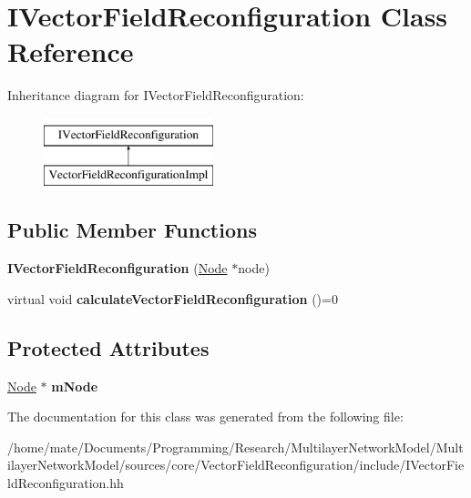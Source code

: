 \hypertarget{classIVectorFieldReconfiguration}{}\section{I\+Vector\+Field\+Reconfiguration Class Reference}
\label{classIVectorFieldReconfiguration}
Inheritance diagram for I\+Vector\+Field\+Reconfiguration\+:\begin{figure}[H]
\begin{center}
\leavevmode
\includegraphics[height=2.000000cm]{classIVectorFieldReconfiguration}
\end{center}
\end{figure}
\subsection*{Public Member Functions}
\begin{DoxyCompactItemize}
\item 
{\bfseries I\+Vector\+Field\+Reconfiguration} (\hyperlink{classNode}{Node} $\ast$node)\hypertarget{classIVectorFieldReconfiguration_a6b663421658c873129a81c3597e0a4c1}{}\label{classIVectorFieldReconfiguration_a6b663421658c873129a81c3597e0a4c1}

\item 
virtual void {\bfseries calculate\+Vector\+Field\+Reconfiguration} ()=0\hypertarget{classIVectorFieldReconfiguration_a3d4ae2c51645c6e6e1955d7ea152ec04}{}\label{classIVectorFieldReconfiguration_a3d4ae2c51645c6e6e1955d7ea152ec04}

\end{DoxyCompactItemize}
\subsection*{Protected Attributes}
\begin{DoxyCompactItemize}
\item 
\hyperlink{classNode}{Node} $\ast$ {\bfseries m\+Node}\hypertarget{classIVectorFieldReconfiguration_a3a8452d0f63f8c9e05e1ad6faab26325}{}\label{classIVectorFieldReconfiguration_a3a8452d0f63f8c9e05e1ad6faab26325}

\end{DoxyCompactItemize}


The documentation for this class was generated from the following file\+:\begin{DoxyCompactItemize}
\item 
/home/mate/\+Documents/\+Programming/\+Research/\+Multilayer\+Network\+Model/\+Multilayer\+Network\+Model/sources/core/\+Vector\+Field\+Reconfiguration/include/I\+Vector\+Field\+Reconfiguration.\+hh\end{DoxyCompactItemize}
